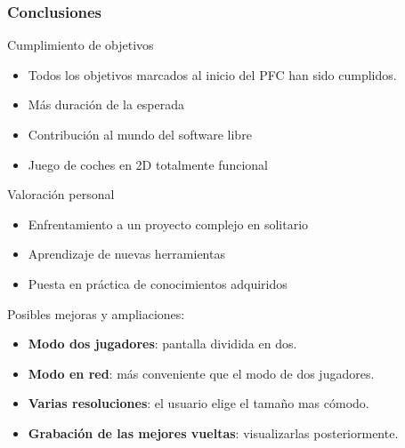 \begin{frame}
    \frametitle{Conclusiones}

        \begin{block}{Cumplimiento de objetivos}
            \begin{itemize}
                \item Todos los objetivos marcados al inicio del PFC han sido cumplidos.
                \item Más duración de la esperada
                \item Contribución al mundo del software libre
                \item Juego de coches en 2D totalmente funcional
            \end{itemize}
        \end{block}

        \begin{block}{Valoración personal}
            \begin{itemize}
                \item Enfrentamiento a un proyecto complejo en solitario
                \item Aprendizaje de nuevas herramientas
                \item Puesta en práctica de conocimientos adquiridos
            \end{itemize}
        \end{block}


        \begin{block}{Posibles mejoras y ampliaciones:}
            \begin{itemize}
                \item \textbf{Modo dos jugadores}: pantalla dividida en dos.

                \item \textbf{Modo en red}: más conveniente que el modo de dos jugadores.
                
                \item \textbf{Varias resoluciones}: el usuario elige el tamaño mas cómodo.
                
                \item \textbf{Grabación de las mejores vueltas}: visualizarlas posteriormente.
                
            \end{itemize}
        \end{block}
        
\end{frame}

